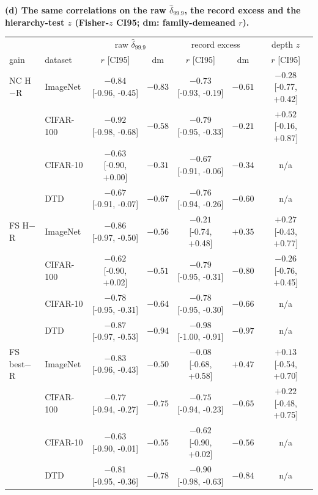\begin{table}[H]\ContinuedFloat
\centering
\scriptsize
\setlength{\tabcolsep}{2.6pt}
\begingroup
\noindent\textbf{(d) The same correlations on the raw $\hat\delta_{99.9}$, the record excess and the hierarchy-test $z$ (Fisher-$z$ CI95; dm: family-demeaned $r$).}\par\vspace{1.5pt}
\setlength{\tabcolsep}{3pt}
\begin{tabular}{llcc|cc|c}
\toprule
 & & \multicolumn{2}{c|}{raw $\hat\delta_{99.9}$} & \multicolumn{2}{c|}{record excess} & depth $z$ \\
gain & dataset & $r$ [CI95] & dm & $r$ [CI95] & dm & $r$ [CI95] \\
\midrule
NC H$-$R & ImageNet & $-0.84$ [-0.96, -0.45] & $-0.83$ & $-0.73$ [-0.93, -0.19] & $-0.61$ & $-0.28$ [-0.77, +0.42] \\
 & CIFAR-100 & $-0.92$ [-0.98, -0.68] & $-0.58$ & $-0.79$ [-0.95, -0.33] & $-0.21$ & $+0.52$ [-0.16, +0.87] \\
 & CIFAR-10 & $-0.63$ [-0.90, +0.00] & $-0.31$ & $-0.67$ [-0.91, -0.06] & $-0.34$ & n/a \\
 & DTD & $-0.67$ [-0.91, -0.07] & $-0.67$ & $-0.76$ [-0.94, -0.26] & $-0.60$ & n/a \\
\midrule
FS H$-$R & ImageNet & $-0.86$ [-0.97, -0.50] & $-0.56$ & $-0.21$ [-0.74, +0.48] & $+0.35$ & $+0.27$ [-0.43, +0.77] \\
 & CIFAR-100 & $-0.62$ [-0.90, +0.02] & $-0.51$ & $-0.79$ [-0.95, -0.31] & $-0.80$ & $-0.26$ [-0.76, +0.45] \\
 & CIFAR-10 & $-0.78$ [-0.95, -0.31] & $-0.64$ & $-0.78$ [-0.95, -0.30] & $-0.66$ & n/a \\
 & DTD & $-0.87$ [-0.97, -0.53] & $-0.94$ & $-0.98$ [-1.00, -0.91] & $-0.97$ & n/a \\
\midrule
FS best$-$R & ImageNet & $-0.83$ [-0.96, -0.43] & $-0.50$ & $-0.08$ [-0.68, +0.58] & $+0.47$ & $+0.13$ [-0.54, +0.70] \\
 & CIFAR-100 & $-0.77$ [-0.94, -0.27] & $-0.75$ & $-0.75$ [-0.94, -0.23] & $-0.65$ & $+0.22$ [-0.48, +0.75] \\
 & CIFAR-10 & $-0.63$ [-0.90, -0.01] & $-0.55$ & $-0.62$ [-0.90, +0.02] & $-0.56$ & n/a \\
 & DTD & $-0.81$ [-0.95, -0.36] & $-0.78$ & $-0.90$ [-0.98, -0.63] & $-0.84$ & n/a \\
\bottomrule
\end{tabular}
\par\vspace{5pt}

\end{table}

